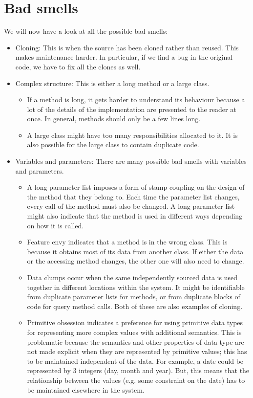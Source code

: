 \documentclass[a4paper, openany]{memoir}
\begin{document}
\section{Bad smells}
We will now have a look at all the possible bad smells:
\begin{itemize}
    \item Cloning: This is when the source has been cloned rather than reused. This makes maintenance harder. In particular, if we find a bug in the original code, we have to fix all the clones as well.
    \item Complex structure: This is either a long method or a large class. 
    \begin{itemize}
        \item If a method is long, it gets harder to understand its behaviour because a lot of the details of the implementation are presented to the reader at once. In general, methods should only be a few lines long. 
        \item A large class might have too many responsibilities allocated to it. It is also possible for the large class to contain duplicate code.
    \end{itemize}
    \item Variables and parameters: There are many possible bad smells with variables and parameters.
    \begin{itemize}
        \item A long parameter list imposes a form of stamp coupling on the design of the method that they belong to. Each time the parameter list changes, every call of the method must also be changed. A long parameter list might also indicate that the method is used in different ways depending on how it is called.
        \item Feature envy indicates that a method is in the wrong class. This is because it obtains most of its data from another class. If either the data or the accessing method changes, the other one will also need to change.
        \item Data clumps occur when the same independently sourced data is used together in different locations within the system. It might be identifiable from duplicate parameter lists for methods, or from duplicate blocks of code for query method calls. Both of these are also examples of cloning.
        \item Primitive obsession indicates a preference for using primitive data types for representing more complex values with additional semantics. This is problematic because the semantics and other properties of data type are not made explicit when they are represented by primitive values; this has to be maintained independent of the data. For example, a date could be represented by 3 integers (day, month and year). But, this means that the relationship between the values (e.g. some constraint on the date) has to be maintained elsewhere in the system.

\end{itemize}
\end{itemize}
\end{document}
